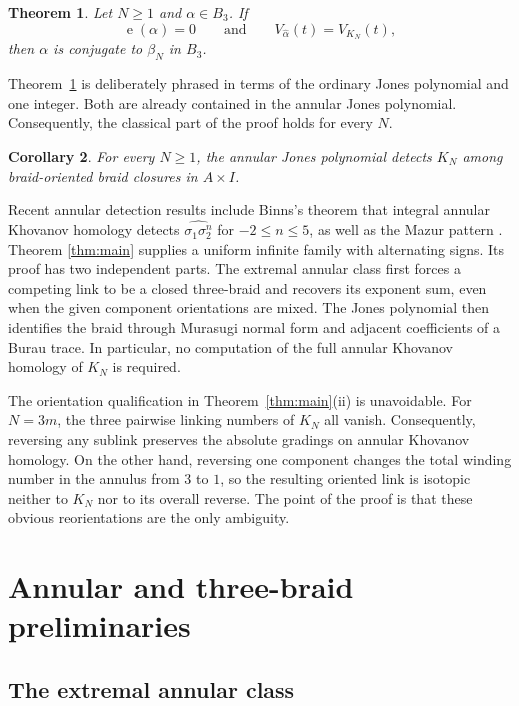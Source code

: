 \documentclass[11pt]{amsart}
\newtheorem{theorem}{Theorem}[section]
\newtheorem{corollary}[theorem]{Corollary}
\theoremstyle{remark}
\newcommand{\e}{\operatorname{e}}
\begin{document}
\begin{theorem}\label{thm:rigidity}
Let \(N\geq 1\) and \(\alpha\in B_3\).  If
\[
  \e(\alpha)=0
  \qquad\text{and}\qquad
  V_{\widehat\alpha}(t)=V_{K_N}(t),
\]
then \(\alpha\) is conjugate to \(\beta_N\) in \(B_3\).
\end{theorem}

Theorem~\ref{thm:rigidity} is deliberately phrased in terms of the ordinary Jones
polynomial and one integer.  Both are already contained in the annular Jones
polynomial.  Consequently, the classical part of the proof holds for every \(N\).

\begin{corollary}\label{cor:annular-jones}
For every \(N\geq 1\), the annular Jones polynomial detects \(K_N\) among
braid-oriented braid closures in \(A\times I\).
\end{corollary}

Recent annular detection results include Binns's theorem that integral annular
Khovanov homology detects \(\widehat{\sigma_1\sigma_2^n}\) for
\(-2\leq n\leq 5\), as well as the Mazur pattern \cite{Binns}.  Theorem
\ref{thm:main} supplies a uniform infinite family with alternating signs.  Its proof
has two independent parts.  The extremal annular class first forces a competing link
to be a closed three-braid and recovers its exponent sum, even when the given component
orientations are mixed.  The Jones polynomial then identifies the braid through
Murasugi normal form and adjacent coefficients of a Burau trace.  In particular, no
computation of the full annular Khovanov homology of \(K_N\) is required.

The orientation qualification in Theorem~\ref{thm:main}(ii) is unavoidable.  For
\(N=3m\), the three pairwise linking numbers of \(K_N\) all vanish.  Consequently,
reversing any sublink preserves the absolute gradings on annular Khovanov homology.
On the other hand, reversing one component changes the total winding number in the
annulus from \(3\) to \(1\), so the resulting oriented link is isotopic neither to
\(K_N\) nor to its overall reverse.  The point of the proof is that these obvious
reorientations are the only ambiguity.

\section{Annular and three-braid preliminaries}

\subsection{The extremal annular class}
\end{document}

